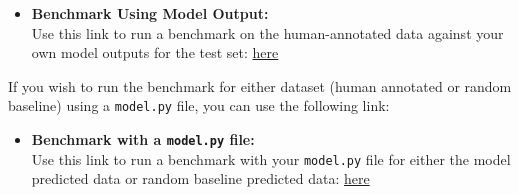 \documentclass{article}
\begin{document}
\begin{itemize}
    \item \textbf{Benchmark Using Model Output:} \\
    Use this link to run a benchmark on the human-annotated data against your own model outputs for the test set: 
    \href{https://www.codabench.org/competitions/6189/}{here}
    
\end{itemize}
\noindent
If you wish to run the benchmark for either dataset (human annotated or random baseline) using a \texttt{model.py} file, you can use the following link:

\begin{itemize}
    \item \textbf{Benchmark with a \texttt{model.py} file:} \\
    Use this link to run a benchmark with your \texttt{model.py} file for either the model predicted data or random baseline predicted data:
    \href{https://www.codabench.org/competitions/6181/?secret_key=2c4738bd-fbc5-4263-8bd6-bd7dd1ad9c1a}{here}
\end{itemize}
\end{document}
